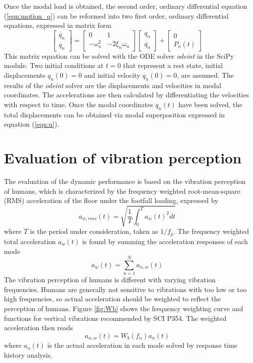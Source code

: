 Once the modal load is obtained, the second order, ordinary differential equation (\ref{eqn:motion_q}) can be reformed into two first order, ordinary differential equations, expressed in matrix form
\begin{equation}
\begin{bmatrix} \dot{q_n}\\ \ddot{q_n} \end{bmatrix} 
=\begin{bmatrix} 0 & 1 \\ -\omega_n^2 & -2\xi_n\omega_n \end{bmatrix}
\begin{bmatrix} q_n\\ \dot{q_n} \end{bmatrix}
+ \begin{bmatrix} 0\\ P_n(t) \end{bmatrix}
\end{equation}
\noindent
This matrix equation can be solved with the ODE solver \textit{odeint} in the SciPy module.  Two initial conditions at $t=0$ that represent a rest state, initial displacements $q_n(0)=0$ and initial velocity $\dot{q_n}(0)=0$, are assumed. The results of the \textit{odeint} solver are the displacements and velocities in modal coordinates. The accelerations are then calculated by differentiating the velocities with respect to time. Once the modal coordinates $q_n(t)$ have been solved, the total displacements can be obtained via modal superposition expressed in equation (\ref{eqn:u}).

\section{Evaluation of vibration perception}
The evaluation of the dynamic performance is based on the vibration perception of humans, which is characterized by the frequency weighted root-mean-square (RMS) acceleration of the floor under the footfall loading, expressed by 
\begin{equation}
\label{eqn:aw_rms}
    a_{w,rms}(t)=\sqrt{\frac{1}{T}\int_0^Ta_w(t)^2dt}
\end{equation}
\noindent
where $T$ is the period under consideration, taken as $1/f_p$. The frequency weighted total acceleration $a_w(t)$ is found by summing the acceleration responses of each mode
\begin{equation}
    a_w(t)=\sum_{n=1}^Na_{n,w}(t)
\end{equation}
\noindent
The vibration perception of humans is different with varying vibration frequencies. Humans are generally not sensitive to vibrations with too low or too high frequencies, so actual acceleration should be weighted to reflect the perception of humans. Figure \ref{fig:Wb} shows the frequency weighting curve and functions for vertical vibrations recommended by SCI P354. The weighted acceleration then reads
\begin{equation}
    a_{n,w}(t)=W_b(f_n)a_n(t)
\end{equation}
\noindent
where $a_n(t)$ is the actual acceleration in each mode solved by response time history analysis.

